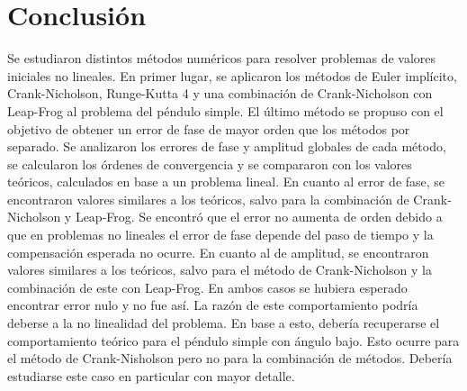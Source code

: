 \documentclass[aps,prb,twocolumn,superscriptaddress,floatfix,longbibliography,10pt]{revtex4-2}
\newcounter{para}
\begin{document}



\section{Conclusión}

Se estudiaron distintos métodos numéricos para resolver problemas de valores iniciales no lineales. En primer lugar, se aplicaron los métodos de Euler implícito, Crank-Nicholson, Runge-Kutta 4 y una combinación de Crank-Nicholson con Leap-Frog al problema del péndulo simple. El último método se propuso con el objetivo de obtener un error de fase de mayor orden que los métodos por separado. Se analizaron los errores de fase y amplitud globales de cada método, se calcularon los órdenes de convergencia y se compararon con los valores teóricos, calculados en base a un problema lineal. En cuanto al error de fase, se encontraron valores similares a los teóricos, salvo para la combinación de Crank-Nicholson y Leap-Frog. Se encontró que el error no aumenta de orden debido a que en problemas no lineales el error de fase depende del paso de tiempo y la compensación esperada no ocurre. En cuanto al de amplitud, se encontraron valores similares a los teóricos, salvo para el método de Crank-Nicholson y la combinación de este con Leap-Frog. En ambos casos se hubiera esperado encontrar error nulo y no fue así. La razón de este comportamiento podría deberse a la no linealidad del problema. En base a esto, debería recuperarse el comportamiento teórico para el péndulo simple con ángulo bajo. Esto ocurre para el método de Crank-Nisholson pero no para la combinación de métodos. Debería estudiarse este caso en particular con mayor detalle. 
\end{document}
